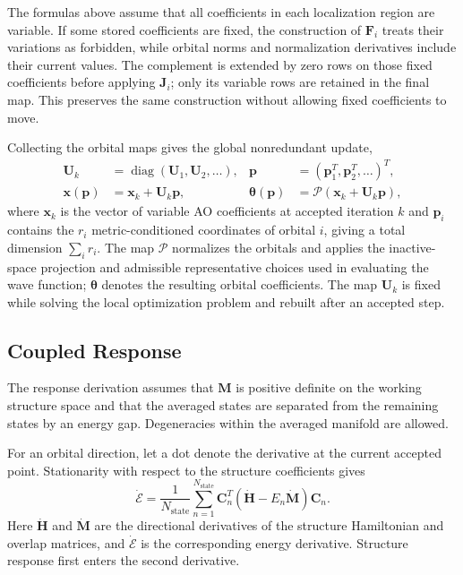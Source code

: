 \documentclass[12pt]{article}
\begin{document}
The formulas above assume that all coefficients in each localization region are variable. If some stored coefficients are fixed, the construction of \(\mathbf F_i\) treats their variations as forbidden, while orbital norms and normalization derivatives include their current values. The complement is extended by zero rows on those fixed coefficients before applying \(\mathbf J_i\); only its variable rows are retained in the final map. This preserves the same construction without allowing fixed coefficients to move.

Collecting the orbital maps gives the global nonredundant update,
\begin{equation}
 \begin{aligned}
 \mathbf U_k&=\operatorname{diag}(\mathbf U_1,\mathbf U_2,\ldots),&
 \mathbf p&=(\mathbf p_1^T,\mathbf p_2^T,\ldots)^T,\\
 \mathbf x(\mathbf p)&=\mathbf x_k+\mathbf U_k\mathbf p,&
 \boldsymbol\theta(\mathbf p)&=\mathcal P(\mathbf x_k+\mathbf U_k\mathbf p),
 \end{aligned}
 \label{eq:update}
\end{equation}
where \(\mathbf x_k\) is the vector of variable AO coefficients at accepted iteration \(k\) and \(\mathbf p_i\) contains the \(r_i\) metric-conditioned coordinates of orbital \(i\), giving a total dimension \(\sum_i r_i\). The map \(\mathcal P\) normalizes the orbitals and applies the inactive-space projection and admissible representative choices used in evaluating the wave function; \(\boldsymbol\theta\) denotes the resulting orbital coefficients. The map \(\mathbf U_k\) is fixed while solving the local optimization problem and rebuilt after an accepted step.

\subsection{Coupled Response}

The response derivation assumes that \(\mathbf M\) is positive definite on the working structure space and that the averaged states are separated from the remaining states by an energy gap. Degeneracies within the averaged manifold are allowed.

For an orbital direction, let a dot denote the derivative at the current accepted point. Stationarity with respect to the structure coefficients gives
\begin{equation}
 \dot{\mathcal E}=\frac{1}{N_{\mathrm{state}}}\sum_{n=1}^{N_{\mathrm{state}}}
 \mathbf C_n^T(\dot{\mathbf H}-E_n\dot{\mathbf M})\mathbf C_n.
 \label{eq:gradient}
\end{equation}
Here \(\dot{\mathbf H}\) and \(\dot{\mathbf M}\) are the directional derivatives of the structure Hamiltonian and overlap matrices, and \(\dot{\mathcal E}\) is the corresponding energy derivative. Structure response first enters the second derivative.
\end{document}
